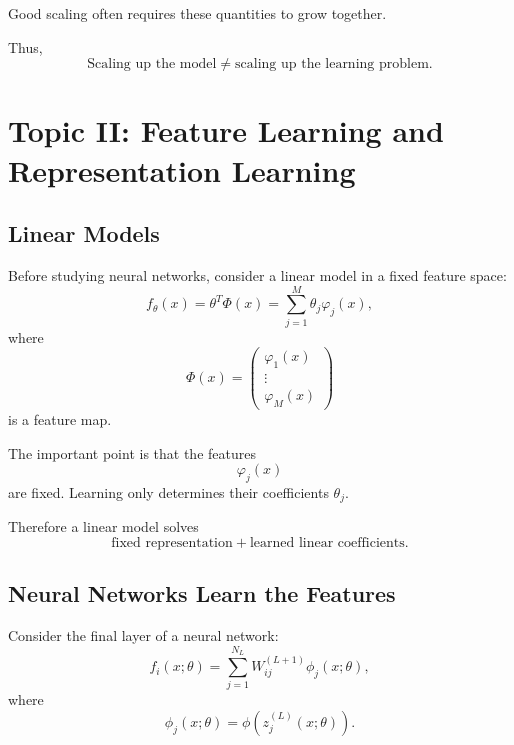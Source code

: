 Good scaling often requires these quantities to grow together.

Thus,
\begin{equation}
    \boxed{
    \text{Scaling up the model}
    \neq
    \text{scaling up the learning problem}.
    }
\end{equation}


\section{Topic II: Feature Learning and Representation Learning}

\subsection{Linear Models}

Before studying neural networks, consider a linear model in a fixed feature
space:
\begin{equation}
    f_\theta(x)
    =
    \theta^T\Phi(x)
    =
    \sum_{j=1}^{M}
    \theta_j\varphi_j(x),
\end{equation}
where
\begin{equation}
    \Phi(x)
    =
    \begin{pmatrix}
        \varphi_1(x)\\
        \vdots\\
        \varphi_M(x)
    \end{pmatrix}
\end{equation}
is a feature map.

The important point is that the features
\begin{equation}
    \varphi_j(x)
\end{equation}
are fixed. Learning only determines their coefficients $\theta_j$.

Therefore a linear model solves
\begin{equation}
    \boxed{
    \text{fixed representation}
    +
    \text{learned linear coefficients}.
    }
\end{equation}


\subsection{Neural Networks Learn the Features}

Consider the final layer of a neural network:
\begin{equation}
    f_i(x;\theta)
    =
    \sum_{j=1}^{N_L}
    W_{ij}^{(L+1)}
    \phi_j(x;\theta),
\end{equation}
where
\begin{equation}
    \phi_j(x;\theta)
    =
    \phi\!\left(
        z_j^{(L)}(x;\theta)
    \right).
\end{equation}

